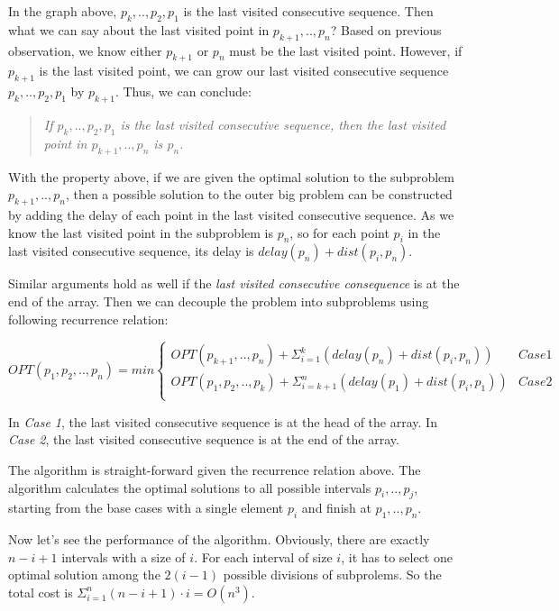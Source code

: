 In the graph above, $p_k, .., p_2, p_1$ is the last visited consecutive sequence. Then what we can say about the last visited point in $p_{k+1}, .., p_n$? Based on previous observation, we know either $p_{k+1}$ or $p_n$ must be the last visited point. However, if $p_{k+1}$ is the last visited point, we can grow our last visited consecutive sequence $p_k, .., p_2, p_1$ by $p_{k+1}$. Thus, we can conclude:

\begin{quote}
\textit{If $p_k, .., p_2, p_1$ is the last visited consecutive sequence, then the last visited point in $p_{k+1}, .., p_n$ is $p_n$.}
\end{quote}

With the property above, if we are given the optimal solution to the subproblem $p_{k+1}, .., p_n$, then a possible solution to the outer big problem can be constructed by adding the delay of each point in the last visited consecutive sequence. As we know the last visited point in the subproblem is $p_n$, so for each point $p_i$ in the last visited consecutive sequence, its delay is $delay(p_n) + dist(p_i, p_n)$.

Similar arguments hold as well if the \textit{last visited consecutive consequence} is at the end of the array. Then we can decouple the problem into subproblems using following recurrence relation:

\[
OPT(p_1, p_2, .., p_n) = min \left\{
  \begin{array}{ll}
    OPT(p_{k+1}, .., p_n) + \Sigma_{i=1}^{k}(delay(p_n) + dist(p_i, p_n)) & Case 1 \\
    OPT(p_1, p_2, .., p_k) + \Sigma_{i=k+1}^{n}(delay(p_1) + dist(p_i, p_1)) & Case 2 \\
  \end{array}\right.
\]

In \textit{Case 1}, the last visited consecutive sequence is at the head of the array. In \textit{Case 2}, the last visited consecutive sequence is at the end of the array.

The algorithm is straight-forward given the recurrence relation above. The algorithm
calculates the optimal solutions to all possible intervals $p_i, .., p_j$, starting from the base cases
with a single element $p_i$ and finish at $p_1, .., p_n$.

Now let's see the performance of the algorithm. Obviously, there are exactly $n - i + 1$ intervals with a size of $i$. For each interval of size $i$, it has to select one optimal solution among the $2(i-1)$ possible divisions of subprolems. So the total cost is $\Sigma_{i=1}^{n} (n - i + 1) \cdot i = O(n^3)$.